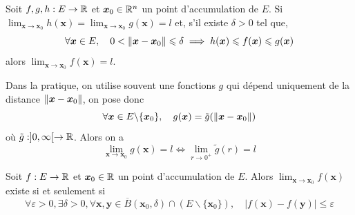 \begin{theorem} \label{thm: théorème des gendarmes}
	Soit $f,g,h : E \to \mathbb{R}$ et $\bm x_0 \in \mathbb{R}^n$ un point d'accumulation de $E$. Si $\lim_{\bm x \to \bm x_0} h(\bm x) = \lim_{\bm x \to \bm x_0} g(\bm x) = l$ et, s'il existe $\delta > 0$ tel que,
	\[
	\forall \bm x \in E, \quad 0 < \| \bm x - \bm x_0 \| \leqslant \delta \implies h(\bm x) \leqslant f(\bm x) \leqslant g(\bm x)
	\]
	alors $\lim_{\bm x \to \bm x_0} f(\bm x) = l$.
\end{theorem}

\begin{proposition}
	Dans la pratique, on utilise souvent une fonctions $g$ qui dépend uniquement de la distance $\| \bm x - \bm x_0 \|$, on pose donc
	\[
	\forall \bm x \in E \backslash \{ \bm x_0\}, \quad g(\bm x) = \tilde g(\| \bm x - \bm x_0 \|)
	\]
	où $\tilde g : ]0, \infty[ \to \mathbb{R}$. Alors on a
	\[
	\lim_{\bm x \to \bm x_0} g(\bm x) = l \iff \lim_{r \to 0^+} \tilde g (r) = l
	\]
\end{proposition}

\prf{En effet,
	\[
	\forall \varepsilon >0, \exists \delta > 0, \forall \in E, \quad 0 < \norme{\bm x- \bm x_0} \leqslant \delta \implies |g(\bm x) - l|  = |\tilde g(\norme{\bm x - \bm x_0}) - l | \leqslant \varepsilon
	\]
	si et seulement si
	\[
	\forall \varepsilon >0, \exists \delta > 0, \quad \forall r \in ]0, \delta], \quad |\tilde g (r) - l | \leqslant \varepsilon
	\]
}

\begin{theorem} \label{thm: Critère de Cauchy}
Soit $f : E \to \mathbb{R}$ et $\bm x_0 \in \mathbb{R}$ un point d'accumulation de $E$. Alors $\lim_{\bm x \to \bm x_0} f(\bm x)$ existe si et seulement si
	\[
	\forall \varepsilon >0, \exists \delta >0, \forall \bm x, \bm y \in \overline B (\bm x_0, \delta) \cap( E \backslash \{ \bm x_0\}), \quad | f(\bm x) - f(\bm y)| \leqslant \varepsilon
	\]
\end{theorem}


